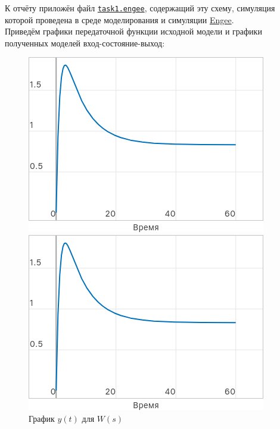 \documentclass[a4paper]{article}
\begin{document}
К отчёту приложён файл \href{run:sources}{\texttt{task1.engee}}, содержащий эту схему, симуляция которой проведена в среде моделирования и симуляции \href{https://start.engee.com/}{Engee}.\\[0.5em]
Приведём графики передаточной функции исходной модели и графики полученных моделей вход-состояние-выход:
\begin{figure}[H]
    \centering
    \begin{minipage}{0.32\textwidth}
        \includegraphics[width=\textwidth]{sources/task1_wp.png}
        \caption*{График $y(t)$ для $W(s)$}
    \end{minipage}
    \hfill
    \begin{minipage}{0.32\textwidth}
        \includegraphics[width=\textwidth]{sources/task1_kuf.png}

\end{minipage}
\end{figure}
\end{document}
